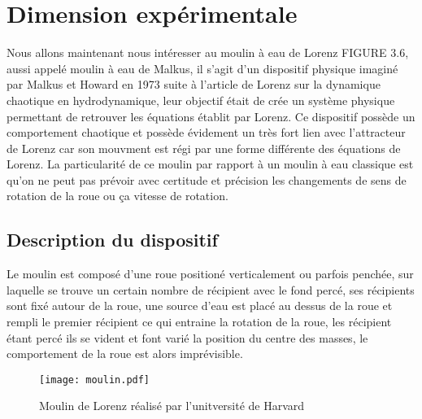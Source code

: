 \section{Dimension expérimentale}

Nous allons maintenant nous intéresser au moulin à eau de Lorenz FIGURE 3.6, aussi appelé moulin à eau de Malkus, il s'agit d'un dispositif physique imaginé par Malkus et Howard en 1973 suite à l'article de
Lorenz sur la dynamique chaotique en hydrodynamique, leur objectif était de crée un système physique permettant de retrouver les équations établit par Lorenz. Ce dispositif possède un comportement chaotique et possède évidement un très fort lien avec l'attracteur de Lorenz car son mouvment est régi par une forme différente des équations de Lorenz. La particularité de ce moulin par rapport à un moulin à eau classique est qu'on ne peut pas prévoir avec certitude et précision les changements de sens de rotation de la roue ou ça vitesse de rotation.

\subsection{Description du dispositif}

Le moulin est composé d'une roue positioné verticalement ou parfois penchée, sur laquelle se trouve un certain nombre de récipient avec le fond percé, ses récipients sont fixé autour de la roue, une source d'eau est placé au dessus de la roue et rempli le premier récipient ce qui entraine la rotation de la roue, les récipient étant percé ils se vident et font varié la position du centre des masses, le comportement de la roue est alors imprévisible.

\begin{figure}
    \texttt{[image: moulin.pdf]}
    \caption{Moulin de Lorenz réalisé par l'unitversité de Harvard} 
\end{figure}

